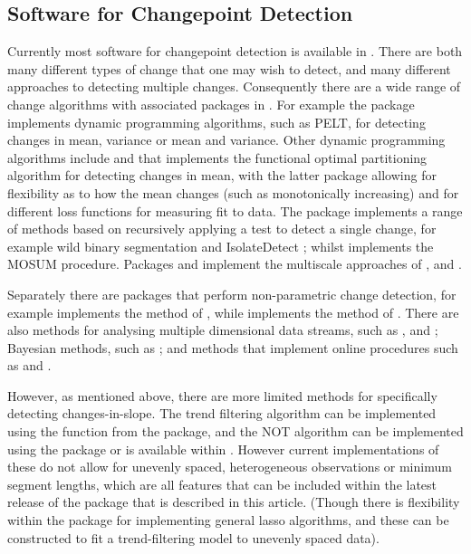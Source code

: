 \documentclass[nojss]{jss}
\begin{document}
\subsection{Software for Changepoint Detection}

Currently most software for changepoint detection is available in  \cite[the main exception being the   package of][which has similar functionality to the  described below]{truong2018ruptures}.
There are both many different types of change that one may wish to detect, and many different approaches to detecting multiple changes. Consequently there are a wide range of change algorithms with associated packages in . For example the  package \citep{killick2014changepoint} implements dynamic programming algorithms, such as PELT, for detecting changes in mean, variance or mean and variance. Other dynamic programming algorithms include  and  \citep{runge2020gfpop} that implements the functional optimal partitioning algorithm \citep{maidstone2017optimal} for detecting changes in mean, with the latter package allowing for flexibility as to how the mean changes (such as monotonically increasing) and for different loss functions for measuring fit to data. The  package implements a range of methods based on recursively applying a test to detect a single change, for example wild binary segmentation \citep{fryzlewicz2014wild} and IsolateDetect \citep{anastasiou2022detecting}; whilst  \citep{meier2021mosum} implements the MOSUM procedure. Packages  and  implement the multiscale approaches of \cite{frick2014multiscale}, \cite{pein2017heterogeneous} and \cite{li2016fdr}.

Separately there are packages that perform non-parametric change detection, for example  \citep{james2015ecp} implements the method of \cite{matteson2014nonparametric}, while   implements the method of \cite{haynes2017NP}. There are also methods for analysing multiple dimensional data streams, such as  \citep{wang2018high}, %
and  \citep{grundy2020high}; Bayesian methods, such as  \citep{erdman2008bcp}; and methods that implement online procedures such as  \citep{ross2015parametric} and  \citep{romano2021fast}.

However, as mentioned above, there are more limited methods for specifically detecting changes-in-slope.  The trend filtering algorithm can be implemented using the  function from the  \citep{genlasso} package, and the NOT algorithm can be implemented using the  package or is available within . However current implementations of these do not allow for unevenly spaced, heterogeneous observations or minimum segment lengths, which are all features that can be included within the latest release of the  package that is described in this article. (Though there is flexibility within the  package for implementing general lasso algorithms, and these can be constructed to fit a trend-filtering model to unevenly spaced data). 
\end{document}
